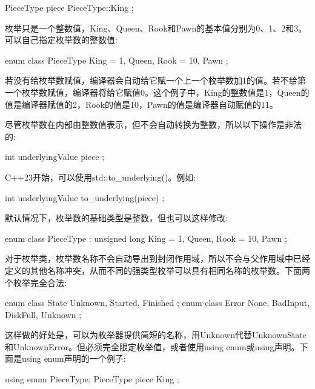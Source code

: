 \begin{cpp}
PieceType piece { PieceType::King };
\end{cpp}

枚举只是一个整数值，King、Queen、Rook和Pawn的基本值分别为0、1、2和3。可以自己指定枚举数的整数值:

\begin{cpp}
enum class PieceType
{
    King = 1,
    Queen,
    Rook = 10,
    Pawn
};
\end{cpp}

若没有给枚举数赋值，编译器会自动给它赋一个上一个枚举数加1的值。若不给第一个枚举数赋值，编译器将给它赋值0。这个例子中，King的整数值是1，Queen的值是编译器赋值的2，Rook的值是10，Pawn的值是编译器自动赋值的11。

尽管枚举数在内部由整数值表示，但不会自动转换为整数，所以以下操作是非法的:

\begin{cpp}
int underlyingValue { piece };
\end{cpp}


C++23开始，可以使用std::to\_underlying()。例如:

\begin{cpp}
int underlyingValue { to_underlying(piece) };
\end{cpp}

默认情况下，枚举数的基础类型是整数，但也可以这样修改:

\begin{cpp}
enum class PieceType : unsigned long
{
    King = 1,
    Queen,
    Rook = 10,
    Pawn
};
\end{cpp}

对于枚举类，枚举数名称不会自动导出到封闭作用域，所以不会与父作用域中已经定义的其他名称冲突，从而不同的强类型枚举可以具有相同名称的枚举数。下面两个枚举完全合法:

\begin{cpp}
enum class State { Unknown, Started, Finished };
enum class Error { None, BadInput, DiskFull, Unknown };
\end{cpp}

这样做的好处是，可以为枚举器提供简短的名称，用Unknown代替UnknownState和UnknownError。但必须完全限定枚举值，或者使用using enum或using声明。下面是using enum声明的一个例子:

\begin{cpp}
using enum PieceType;
PieceType piece { King };
\end{cpp}


